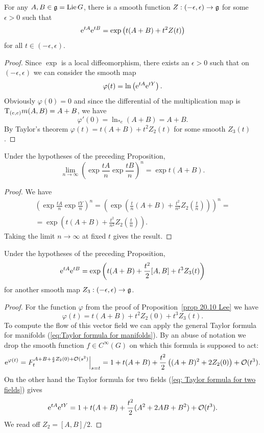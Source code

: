 \begin{prop}\label{prop 20.10 Lee}
    For any $A,B\in\mathfrak{g}=\operatorname{Lie} G$, there is a smooth function $Z:(-\epsilon,\epsilon)\to \mathfrak{g}$ for some $\epsilon>0$ such that
    \[\mathrm{e}^{tA}\mathrm{e}^{tB}=\exp\left(t(A+B)+t^2Z(t)\right)\]
    for all $t\in(-\epsilon,\epsilon)$.
\end{prop}
\begin{proof}
    Since $\exp$ is a local diffeomorphism, there exists an $\epsilon>0$ such that on $(-\epsilon,\epsilon)$ we can consider the smooth map
    \[\varphi(t)=\ln\left(\mathrm{e}^{tA}\mathrm{e}^{tY}\right).\]
    Obviously $\varphi(0)=0$ and since the differential of the multiplication map is $\mathrm{T}_{(e,e)}m(A,B)=A+B$, we have
    \[\varphi'(0)=\ln_{\ast e}(A+B)=A+B.\]
    By Taylor's theorem $\varphi(t)=t(A+B)+t^2Z_2(t)$ for some smooth $Z_3(t)$.
\end{proof}
\begin{cor}\label{cor 20.11 Lee}
    Under the hypotheses of the preceding Proposition,
    \[\lim_{n\to\infty}\left(\exp \frac{tA}{n}\exp \frac{tB}{n}\right)^n=\exp t(A+B).\]
\end{cor}
\begin{proof}
    We have 
    \begin{multline}
        \left(\exp \frac{tA}{n}\exp \frac{tY}{n}\right)^n=\left(\exp\left(\frac{t}{n}(A+B)+\frac{t^2}{n^2}Z_2\left(\frac{t}{n}\right)\right)\right)^n=\\
        =\exp\left(t(A+B)+\frac{t^2}{n^2}Z_2\left(\frac tn\right)\right).
    \end{multline}
    Taking the limit $n\to\infty$ at fixed $t$ gives the result.
\end{proof}

\begin{prop}
    Under the hypotheses of the preceding Proposition, 
    \[\mathrm{e}^{tA}\mathrm{e}^{tB}=\exp\left(t(A+B)+\frac{t^2}{2}[A,B]+t^3Z_3(t)\right)\]
    for another smooth map $Z_3:(-\epsilon,\epsilon)\to \mathfrak{g}$.
\end{prop}
\begin{proof}
    For the function $\varphi$ from the proof of Proposition~\ref{prop 20.10 Lee} we have
    \[\varphi(t)=t(A+B)+t^2Z_2(0)+t^3Z_3(t).\]
    To compute the flow of this vector field we can apply the general Taylor formula for manifolds (\ref{eq:Taylor formula for manifolds}). By an abuse of notation we drop the smooth function $f\in C^\infty(G)$ on which this formula is supposed to act:
    \[\rme^{\varphi(t)}=\restr{F^{A+B+\frac{s}{2}Z_2(0)+\calO(s^2)}_t}{s=t}=1+t(A+B)+\frac{t^2}{2}\left((A+B)^2+2Z_2(0)\right)+\calO(t^3).\]
    On the other hand the Taylor formula for two fields (\ref{eq: Taylor formula for two fields}) gives
    \[\mathrm{e}^{tA}\mathrm{e}^{tY}=1+t(A+B)+\frac{t^2}{2}(A^2+2AB+B^2)+\mathcal{O}(t^3).\]
    We read off $Z_2=[A,B]/2$.
\end{proof}

